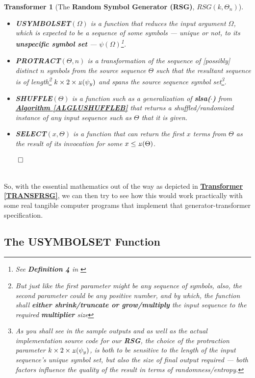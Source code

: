 \documentclass[a4paper, 18pt]{book} %
\newtheorem{transf}{Transformer}
\newcommand{\invpi}{\rotatebox[origin=c]{180}{$\pi$}}
\begin{document}
{\begin{minipage}{0.9\textwidth}
\begin{transf}[The \textbf{Random Symbol Generator (RSG)}, $RSG(k,\Theta_n)$]
\begin{itemize}
{}
\item \textbf{USYMBOLSET}$(\Omega)$ is a function that reduces the input argument $\Omega$, which is expected to be a sequence of some symbols --- unique or not, to its \textbf{unspecific symbol set} --- $\psi(\Omega)$\footnote{See \textbf{Definition 4} in \cite{ossipaper}}.
\item \textbf{PROTRACT}$(\Theta, n)$ is a transformation of the sequence of [possibly] distinct $n$ symbols from the source sequence $\Theta$ such that the resultant sequence is of length\footnote{But just like the first parameter might be any sequence of symbols, also, the second parameter could be any positive number, and by which, the function shall \textbf{either shrink/truncate or grow/multiply} the input sequence to the required \textbf{multiplier} size} $k \times 2 \times \invpi(\psi_y)$ and spans the source sequence symbol set\footnote{As you shall see in the sample outputs and as well as the actual implementation source code for our \textbf{RSG}, the choice of the protraction parameter $k \times 2 \times \invpi(\psi_y)$, is both to be sensitive to the length of the input sequence's unique symbol set, but also the size of final output required --- both factors influence the quality of the result in terms of randomness/entropy.}.
\item  \textbf{SHUFFLE}$(\Theta)$ is a function such as a generalization of \textbf{slsa($\cdot$)} from \textbf{\hyperref[ALGLUSHUFFLEB]{Algorithm \ref{ALGLUSHUFFLEB}}} that returns a shuffled/randomized instance of any input sequence such as $\Theta$ that it is given.
\item \textbf{SELECT}$(x, \Theta)$ is a function that can return the first $x$ terms from $\Theta$ as the result of its invocation for some $x \leq \invpi(\Theta)$.
\end{itemize}
$\qed$
\end{transf}
\end{minipage}}
\\

So, with the essential mathematics out of the way as depicted in \textbf{\hyperref[TRANSFRSG]{Transformer \ref{TRANSFRSG}}}, we can then try to see how this would work practically with some real tangible computer programs that implement that generator-transformer specification.

\subsection{The USYMBOLSET Function}
\end{document}
